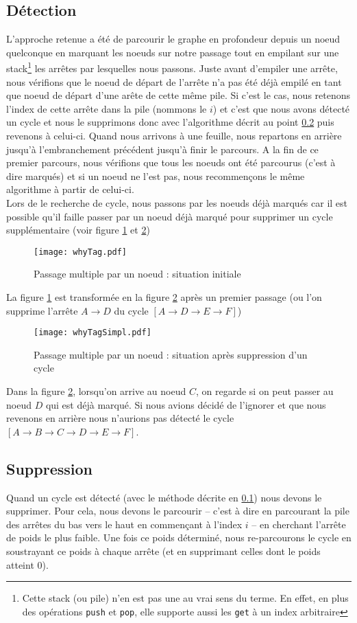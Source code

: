 \documentclass[12pt, oneside]{article}
\begin{document}
\subsection{Détection}
\label{detect}
L'approche retenue a été de parcourir le graphe en profondeur depuis un noeud quelconque en marquant les noeuds sur notre passage tout en empilant sur une stack\footnote{Cette stack (ou pile) n'en est pas une au vrai sens du terme. En effet, en plus des opérations \texttt{push} et \texttt{pop}, elle supporte aussi les \texttt{get} à un index arbitraire} les arrêtes par lesquelles nous passons. Juste avant d'empiler une arrête, nous vérifions que le noeud de départ de l'arrête n'a pas été déjà empilé en tant que noeud de départ d'une arête de cette même pile.
Si c'est le cas, nous retenons l'index de cette arrête dans la pile (nommons le $i$) et c'est que nous avons détecté un cycle et nous le supprimons donc avec l'algorithme décrit au point \ref{del} puis revenons à celui-ci.
Quand nous arrivons à une feuille, nous repartons en arrière jusqu'à l'embranchement précédent jusqu'à finir le parcours.
A la fin de ce premier parcours, nous vérifions que tous les noeuds ont été parcourus (c'est à dire marqués) et si un noeud ne l'est pas, nous recommençons le même algorithme à partir de celui-ci.\\
Lors de le recherche de cycle, nous passons par les noeuds déjà marqués car il est possible qu'il faille passer par un noeud déjà marqué pour supprimer un cycle supplémentaire (voir figure \ref{whyTag} et \ref{whyTagSimpl})
\begin{figure}[h]
\caption{\label{whyTag} Passage multiple par un noeud : situation initiale}
\center
\texttt{[image: whyTag.pdf]}
\end{figure}
La figure \ref{whyTag} est transformée en la figure \ref{whyTagSimpl} après un premier passage
(ou l'on supprime l'arrête $A \rightarrow D$ du cycle $[A \rightarrow D \rightarrow E \rightarrow F]$)
\begin{figure}[h]
\caption{\label{whyTagSimpl} Passage multiple par un noeud : situation après suppression d'un cycle}
\center
\texttt{[image: whyTagSimpl.pdf]}
\end{figure}
Dans la figure \ref{whyTagSimpl}, lorsqu'on arrive au noeud $C$, on regarde si on peut passer au noeud $D$ qui est déjà marqué. Si nous avions décidé de l'ignorer et que nous revenons en arrière nous n'aurions pas détecté le cycle $[A \rightarrow B \rightarrow C \rightarrow D \rightarrow E \rightarrow F]$.
\subsection{Suppression}
\label{del}
Quand un cycle est détecté (avec le méthode décrite en \ref{detect}) nous devons le supprimer. Pour cela, nous devons le parcourir -- c'est à dire en parcourant la pile des arrêtes du bas vers le haut en commençant à l'index $i$ -- en cherchant l'arrête de poids le plus faible. Une fois ce poids déterminé, nous re-parcourons le cycle en soustrayant ce poids à chaque arrête (et en supprimant celles dont le poids atteint 0).
\end{document}
